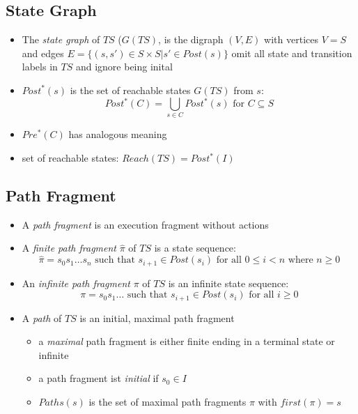 \documentclass[a4paper, 10pt]{article}
\begin{document}
\subsection*{State Graph}
\begin{shaded}
\begin{itemize}
    \item The \emph{state graph} of $TS$ ($G(TS)$, is the digraph $(V,E)$ with vertices $V=S$ and edges $E=\{(s,s')\in S\times S | s'\in Post(s)\}$ \follows omit all state and transition labels in $TS$ and ignore being inital
    \item $Post^*(s)$ is the set of reachable states $G(TS)$ from $s$:
    \[ Post^*(C)=\bigcup_{s\in C}Post^*(s) \textrm{ for } C \subseteq S \]
    \item $Pre^*(C)$ has analogous meaning
    \item set of reachable states: $Reach(TS)=Post^*(I)$
\end{itemize}
\end{shaded}

\subsection*{Path Fragment}
\begin{shaded}
    \begin{itemize}
        \item A \emph{path fragment} is an execution fragment without actions
        \item A \emph{finite path fragment} $\hat{\pi}$ of $TS$ is a state sequence:
        \[ \hat{\pi} = s_0s_1\dots s_n \textrm{ such that } s_{i+1}\in Post(s_i) \textrm{ for all } 0 \leq i<n \textrm{ where } n\geq0 \]
        \item An \emph{infinite path fragment} $\pi$ of $TS$ is an infinite state sequence:
        \[ \pi=s_0s_1\dots \textrm{ such that } s_{i+1}\in Post(s_i) \textrm{ for all } i\geq0 \]
        \item A \emph{path} of $TS$ is an initial, maximal path fragment
        \begin{itemize}
            \item a \emph{maximal} path fragment is either finite ending in a terminal state or infinite
            \item a path fragment ist \emph{initial} if $s_0\in I$
            \item $Paths(s)$ is the set of maximal path fragments $\pi$ with $first(\pi)=s$
        \end{itemize}
    \end{itemize}
\end{shaded}
\begin{center}
\scalebox{1}{}
\end{center}
\end{document}
